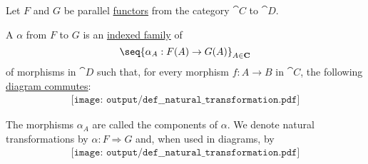 \begin{definition}\label{def:natural_transformation}
  Let \( F \) and \( G \) be parallel \hyperref[def:functor]{functors} from the category \( \cat{C} \) to \( \cat{D} \).

  A  \( \alpha \) from \( F \) to \( G \) is an \hyperref[def:cartesian_product/indexed_family]{indexed family} of
  \begin{equation}\label{eq:def:natural_transformation/family}
    \seq{ \alpha_A: F(A) \to G(A) }_{A \in \cat{C}}
  \end{equation}
  of morphisms in \( \cat{D} \) such that, for every morphism \( f: A \to B \) in \( \cat{C} \), the following \hyperref[def:categorical_diagram]{diagram commutes}:
  \begin{equation}\label{eq:def:natural_transformation/diagram}
    \begin{aligned}
      \texttt{[image: output/def\_\_natural\_transformation.pdf]}
    \end{aligned}
  \end{equation}

  The morphisms \( \alpha_A \) are called the components of \( \alpha \). We denote natural transformations by \( \alpha: F \Rightarrow G \) and, when used in diagrams, by
  \begin{equation}\label{eq:def:natural_transformation/notation}
    \begin{aligned}
      \texttt{[image: output/def\_\_natural\_transformation.pdf]}
    \end{aligned}
  \end{equation}
\end{definition}


